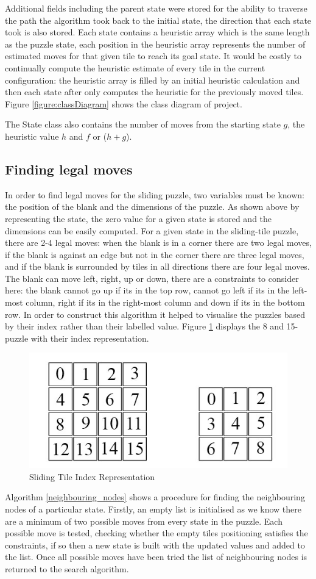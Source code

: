 \documentclass[final]{cmpreport}
\begin{document}
Additional fields including the parent state were stored for the ability to traverse the path the algorithm took back to the initial state, the direction that each state took is also stored. Each state contains a heuristic array which is the same length as the puzzle state, each position in the heuristic array represents the number of estimated moves for that given tile to reach its goal state. It would be costly to continually compute the heuristic estimate of every tile in the current configuration: the heuristic array is filled by an initial heuristic calculation and then each state after only computes the heuristic for the previously moved tiles. Figure \ref{figure:classDiagram} shows the class diagram of project.

The State class also contains the number of moves from the starting state $g$, the heuristic value $h$ and $f$ or ($h+g$).

\subsection{Finding legal moves}
In order to find legal moves for the sliding puzzle, two variables must be known: the position of the blank and the dimensions of the puzzle. As shown above by representing the state, the zero value for a given state is stored and the dimensions can be easily computed. For a given state in the sliding-tile puzzle, there are 2-4 legal moves: when the blank is in a corner there are two legal moves, if the blank is against an edge but not in the corner there are three legal moves, and if the blank is surrounded by tiles in all directions there are four legal moves. The blank can move left, right, up or down, there are a constraints to consider here: the blank cannot go up if its in the top row, cannot go left if its in the left-most column, right if its in the right-most column and down if its in the bottom row. In order to construct this algorithm it helped to visualise the puzzles based by their index rather than their labelled value. Figure \ref{figure:index} displays the 8 and 15-puzzle with their index representation. 
\begin{figure}[h!]
	\centering
	\includegraphics[width=.5\textwidth]{tile_indexes}
	\captionsetup{justification=centering}
	\caption{Sliding Tile Index Representation}
	\label{figure:index}
\end{figure}
Algorithm \ref{neighbouring_nodes} shows a procedure for finding the neighbouring nodes of a particular state. Firstly, an empty list is initialised as we know there are a minimum of two possible moves from every state in the puzzle. Each possible move is tested, checking whether the empty tiles positioning satisfies the constraints, if so then a new state is built with the updated values and added to the list. Once all possible moves have been tried the list of neighbouring nodes is returned to the search algorithm.
\end{document}
